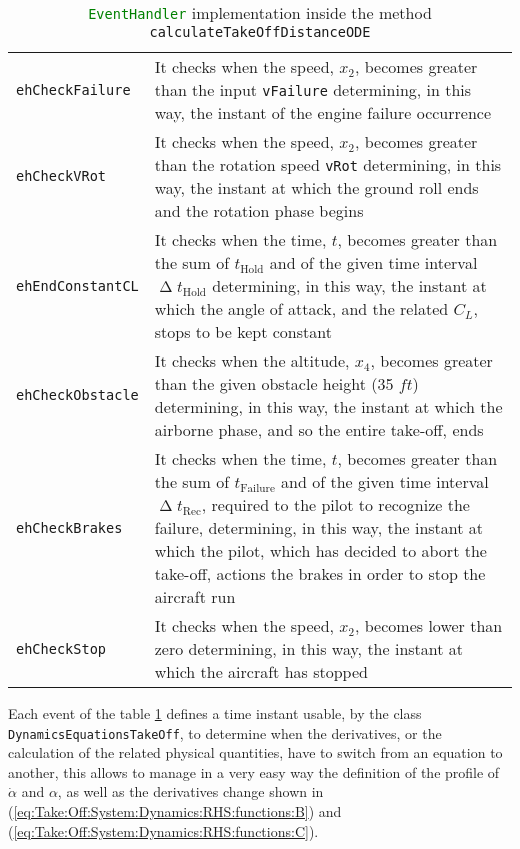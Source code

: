\begin{table}[H]
\begin{tabular}{p{0.17\linewidth}p{0.83\linewidth}}
\toprule
\lstinline[language=Java]!ehCheckFailure! & It checks when the speed, $x_2$, becomes greater than the input \lstinline[language=Java]!vFailure! determining, in this way, the instant of the engine failure occurrence \\ [0.2cm]
\lstinline[language=Java]!ehCheckVRot! & It checks when the speed, $x_2$, becomes greater than the rotation speed \lstinline[language=Java]!vRot! determining, in this way, the instant at which the ground roll ends and the rotation phase begins \\  [0.2cm]
\lstinline[language=Java]!ehEndConstantCL! & It checks when the time, $t$, becomes greater than the sum of  $t_{\text{Hold}}$ and of the given time interval $\upDelta t_{\text{Hold}}$ determining, in this way, the instant at which the angle of attack, and the related $C_L$, stops to be kept constant \\  [0.2cm]
\lstinline[language=Java]!ehCheckObstacle! & It checks when the altitude, $x_4$, becomes greater than the given obstacle height (35 $\si{ft}$) determining, in this way, the instant at which the airborne phase, and so the entire take-off, ends \\  [0.2cm]
\lstinline[language=Java]!ehCheckBrakes! & It checks when the time, $t$, becomes greater than the sum of  $t_{\text{Failure}}$ and of the given time interval $\upDelta t_{\text{Rec}}$, required to the pilot to recognize the failure, determining, in this way, the instant at which the pilot, which has decided to abort the take-off, actions the brakes in order to stop the aircraft run\\  [0.2cm]
\lstinline[language=Java]!ehCheckStop! &  It checks when the speed, $x_2$, becomes lower than zero determining, in this way, the instant at which the aircraft has stopped \\ 
\bottomrule
\end{tabular}
\caption{\lstinline[language=Java]!EventHandler! implementation inside the method \lstinline[language=Java]!calculateTakeOffDistanceODE!}
\label{table:EventHandler}
\end{table}
%
\noindent
Each event of the table \ref{table:EventHandler} defines a time instant usable, by the class \lstinline[language=Java]!DynamicsEquationsTakeOff!, to determine when the derivatives, or the calculation of the related physical quantities, have to switch from an equation to another, this allows to manage in a very easy way the definition of the profile of $\dot\alpha$ and $\alpha$, as well as the derivatives change shown in (\ref{eq:Take:Off:System:Dynamics:RHS:functions:B}) and (\ref{eq:Take:Off:System:Dynamics:RHS:functions:C}).  

